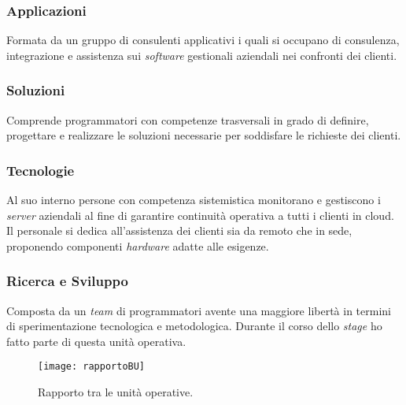 \subsubsection*{Applicazioni}
Formata da un gruppo di consulenti applicativi i quali si occupano di consulenza, integrazione e assistenza sui \emph{software} gestionali aziendali nei confronti dei clienti. 

\subsubsection*{Soluzioni}
Comprende programmatori con competenze trasversali in grado di definire, progettare e realizzare le soluzioni necessarie per soddisfare le richieste dei clienti. 

\subsubsection*{Tecnologie}
Al suo interno persone con competenza sistemistica monitorano e gestiscono i \emph{server} aziendali al fine di garantire continuità operativa a tutti i clienti in \gls{cloud}. Il personale si dedica all'assistenza dei clienti sia da remoto che in sede, proponendo componenti \emph{hardware} adatte alle esigenze. 

\subsubsection*{Ricerca e Sviluppo}
Composta da un \emph{team} di programmatori avente una maggiore libertà in termini di sperimentazione tecnologica e metodologica. Durante il corso dello \emph{stage} ho fatto parte di questa unità operativa.\\
\begin{figure}[htbp] 
    \centering 
    \texttt{[image: rapportoBU]}
    \caption{Rapporto tra le unità operative.} 
    \label{fig:rapportoBU}
\end{figure}
